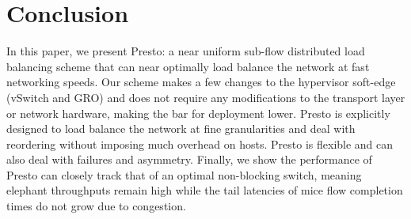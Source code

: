 \section{Conclusion}
\label{sec:conclusion}
In this paper, we present Presto: a near uniform sub-flow distributed load balancing scheme
that can near optimally load balance the network at fast networking speeds.
Our scheme makes a few changes to the hypervisor soft-edge (vSwitch and GRO)
and does not require any modifications to the transport layer or network hardware, making
the bar for deployment lower. 
Presto is explicitly designed to load balance the network at fine granularities
and deal with reordering without imposing much overhead on hosts. Presto is flexible and can also
deal with failures and asymmetry. Finally, we show the performance of Presto can closely track
that of an optimal non-blocking switch, meaning elephant throughputs remain high while the tail
latencies of mice flow completion times do not grow due to congestion.
